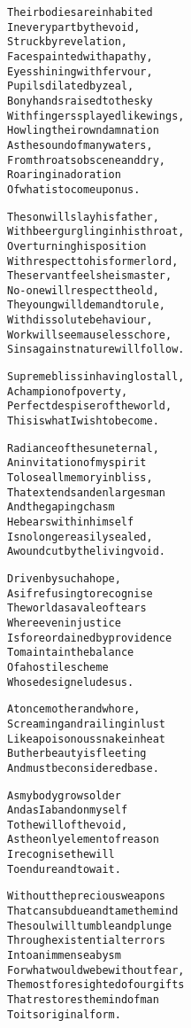 \documentclass{article}
\begin{document}
\begin{alltt}
Their bodies are inhabited
In every part by the void,
Struck by revelation,
Faces painted with apathy,
Eyes shining with fervour,
Pupils dilated by zeal,
Bony hands raised to the sky
With fingers splayed like wings,
Howling their own damnation
As the sound of many waters,
From throats obscene and dry,
Roaring in adoration
Of what is to come upon us.

The son will slay his father,
With beer gurgling in his throat,
Overturning his position
With respect to his former lord,
The servant feels he is master,
No-one will respect the old,
The young will demand to rule,
With dissolute behaviour,
Work will seem a useless chore,
Sins against nature will follow.

Supreme bliss in having lost all,
A champion of poverty,
Perfect despiser of the world,
This is what I wish to become.

Radiance of the sun eternal,
An invitation of my spirit
To lose all memory in bliss,
That extends and enlarges man
And the gaping chasm
He bears within himself
Is no longer easily sealed,
A wound cut by the living void.

Driven by such a hope,
As if refusing to recognise
The world as a vale of tears
Where even injustice
Is foreordained by providence
To maintain the balance
Of a hostile scheme
Whose design eludes us.

At once mother and whore,
Screaming and railing in lust
Like a poisonous snake in heat
But her beauty is fleeting
And must be considered base.

As my body grows older
And as I abandon myself
To the will of the void,
As the only element of reason
I recognise the will
To endure and to wait.

Without the precious weapons
That can subdue and tame the mind
The soul will tumble and plunge
Through existential terrors
Into an immense abysm
For what would we be without fear,
The most foresighted of our gifts
That restores the mind of man
To its original form.
\end{alltt}

\iffalse
Weary and detached from the things of this world
Bedecked with flowers
Torn and dirty habit
Holding up one finger as if in admonition
Immersed in gloom
Justify their carnal life
You hide your face in your hands
The void can be named only through the most distorted things
All these are as smoke then dispersed by the strong wind of faith
Beautiful and terrible as an army arrayed for battle
Nothing exists that so fills and binds the heart as love does
On this side the choir of angels, on that the gaping maw of hell
With the steadfastness of martyrs or the arrogance of the damned
What first triumphed in its folly and took delight in its jesting now is here punished and rewarded, liberated from the seduction of the passions, rigidified by eternity, consigned to the eternal frost that is to preserve and purify it, saved from corruption through the triumph of corruption
The people are transformed into an assembly belched forth from the abysms of the unknown earth
I shall be in the simple foundation, in the silent desert where diversity is never seen
\fi
\end{document}
